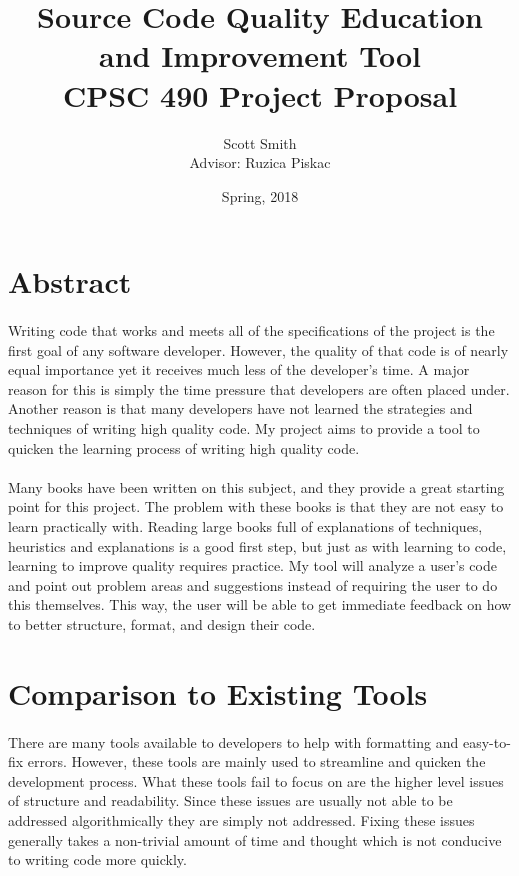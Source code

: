 \documentclass{article}
\title{%
	Source Code Quality Education and Improvement Tool \\
	\large CPSC 490 Project Proposal}
\date{Spring, 2018}
\author{Scott Smith\\[1cm]{\small Advisor: Ruzica Piskac}}
\begin{document}
\maketitle
\newpage

\section{Abstract}
\paragraph{}
Writing code that works and meets all of the specifications of the project is the first goal of any software developer. However, the quality of that code is of nearly equal importance yet it receives much less of the developer's time. A major reason for this is simply the time pressure that developers are often placed under. Another reason is that many developers have not learned the strategies and techniques of writing high quality code. My project aims to provide a tool to quicken the learning process of writing high quality code.
\paragraph{} 
Many books have been written on this subject, and they provide a great starting point for this project. The problem with these books is that they are not easy to learn practically with. Reading large books full of explanations of techniques, heuristics and explanations is a good first step, but just as with learning to code, learning to improve quality requires practice. My tool will analyze a user's code and point out problem areas and suggestions instead of requiring the user to do this themselves. This way, the user will be able to get immediate feedback on how to better structure, format, and design their code.

\section{Comparison to Existing Tools}
\paragraph{} 
There are many tools available to developers to help with formatting and easy-to-fix errors. However, these tools are mainly used to streamline and quicken the development process. What these tools fail to focus on are the higher level issues of structure and readability. Since these issues are usually not able to be addressed algorithmically they are simply not addressed. Fixing these issues generally takes a non-trivial amount of time and thought which is not conducive to writing code more quickly.
\end{document}
